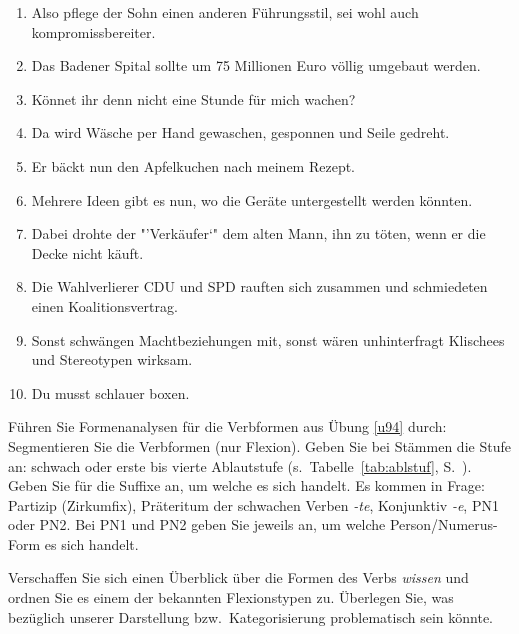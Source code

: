 \begin{sloppypar}
\begin{enumerate}\Lf
  \item Also pflege der Sohn einen anderen Führungsstil, sei wohl auch kompromissbereiter.
  \item Das Badener Spital sollte um 75 Millionen Euro völlig umgebaut werden.
  \item Könnet ihr denn nicht eine Stunde für mich wachen?
  \item Da wird Wäsche per Hand gewaschen, gesponnen und Seile gedreht.
  \item Er bäckt nun den Apfelkuchen nach meinem Rezept.
  \item Mehrere Ideen gibt es nun, wo die Geräte untergestellt werden könnten.
  \item Dabei drohte der "'Verkäufer`" dem alten Mann, ihn zu töten, wenn er die Decke nicht käuft.
  \item Die Wahlverlierer CDU und SPD rauften sich zusammen und schmiedeten einen Koalitionsvertrag.
  \item Sonst schwängen Machtbeziehungen mit, sonst wären unhinterfragt Klischees und Stereotypen wirksam.
  \item Du musst schlauer boxen.
\end{enumerate}

\Uebung \label{u95} Führen Sie Formenanalysen für die Verbformen aus Übung \ref{u94} durch:
Segmentieren Sie die Verbformen (nur Flexion).
Geben Sie bei Stämmen die Stufe an: schwach oder erste bis vierte Ablautstufe (s.\ Tabelle~\ref{tab:ablstuf}, S.~\pageref{tab:ablstuf}).
Geben Sie für die Suffixe an, um welche es sich handelt.
Es kommen in Frage: Partizip (Zirkumfix), Präteritum der schwachen Verben \textit{-te}, Konjunktiv \textit{-e}, PN1 oder PN2.
Bei PN1 und PN2 geben Sie jeweils an, um welche Person/Numerus-Form es sich handelt.

\Uebung[\tristar] \label{u96} Verschaffen Sie sich einen Überblick über die Formen des Verbs \textit{wissen} und ordnen Sie es einem der bekannten Flexionstypen zu.
Überlegen Sie, was bezüglich unserer Darstellung bzw.\ Kategorisierung problematisch sein könnte.

\end{sloppypar}

\WeitereLiteratur


